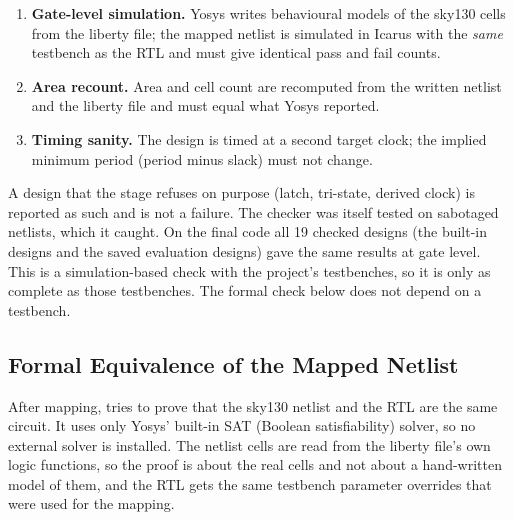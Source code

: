 \begin{enumerate}[label=\textbf{\arabic*.}]
\item \textbf{Gate-level simulation.} Yosys writes behavioural models of the sky130
cells from the liberty file; the mapped netlist is simulated in Icarus with the
\emph{same} testbench as the RTL and must give identical pass and fail counts.
\item \textbf{Area recount.} Area and cell count are recomputed from the written
netlist and the liberty file and must equal what Yosys reported.
\item \textbf{Timing sanity.} The design is timed at a second target clock; the
implied minimum period (period minus slack) must not change.
\end{enumerate}

A design that the stage refuses on purpose (latch, tri-state, derived clock) is
reported as such and is not a failure. The checker was itself tested on sabotaged
netlists, which it caught. On the final code all 19 checked designs (the built-in
designs and the saved evaluation designs) gave the same results at gate level. This is a
simulation-based check with the project's testbenches, so it is only as complete as
those testbenches. The formal check below does not depend on a testbench.

\subsection{Formal Equivalence of the Mapped Netlist}
\label{sec:equiv}
After mapping,  tries to prove that the sky130 netlist and the
RTL are the same circuit. It uses only Yosys' built-in SAT (Boolean satisfiability)
solver, so no external solver is installed. The netlist cells are read from the
liberty file's own logic functions, so the proof is about the real cells and not
about a hand-written model of them, and the RTL gets the same testbench parameter
overrides that were used for the mapping.

